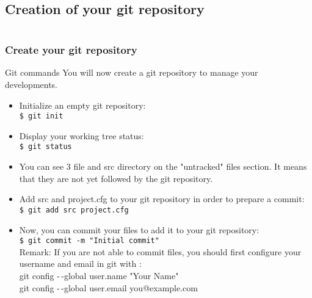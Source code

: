 \documentclass[10pt, hyperref={unicode=true,pdfusetitle, bookmarks=true,bookmarksnumbered=false,bookmarksopen=false, breaklinks=false,pdfborder={0 0 1},backref=true,colorlinks=true,linkcolor=darkblue,pageanchor, urlcolor=darkblue}]{beamer}
\begin{document}
\subsection{{\bf{Creation of your git repository}}}
\begin{frame}
\begin{columns}[c] 
\tableofcontents[sections={1-4},currentsection, currentsubsection]
\tableofcontents[sections={5-10},currentsection, currentsubsection]
\end{columns}
\end{frame}
\begin{frame}
\frametitle{Create your git repository}

\begin{alertblock}{Git commands}
You will now create a git repository to manage your developments.
\begin{itemize}

\item Initialize an empty git repository:\\
\texttt{\$ git init}\\

\item Display your working tree status:\\
\texttt{\$ git status}\\

\item You can see 3 file and src directory on the "untracked" files section.
It means that they are not yet followed by the git repository.

\item Add src and project.cfg to your git repository in order to prepare a commit:\\
\texttt{\$ git add src project.cfg}%

\item Now, you can commit your files to add it to your git repository:\\
\texttt{\$ git commit -m "Initial commit"}\\
Remark: If you are not able to commit files, you should first configure your username and email in git with :\\
git config -\,-global user.name "Your Name" \\
git config -\,-global user.email you@example.com

\end{itemize}

\end{alertblock}
\end{frame}
\end{document}
